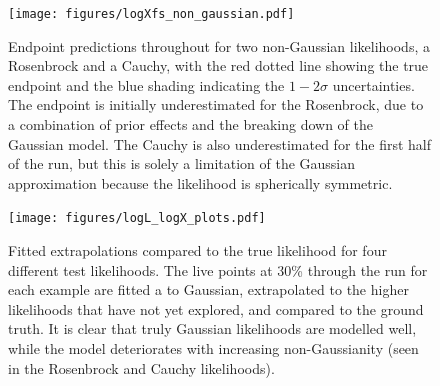 \documentclass[usenatbib]{mnras}
\begin{document}
\begin{figure}
\begin{center}
    \texttt{[image: figures/logXfs\_non\_gaussian.pdf]}
\end{center}
\caption{Endpoint predictions throughout for two non-Gaussian likelihoods, a Rosenbrock and a Cauchy, with the red dotted line showing the true endpoint and the blue shading indicating the $1-2\sigma$ uncertainties. The endpoint is initially underestimated for the Rosenbrock, due to a combination of prior effects and the breaking down of the Gaussian model. The Cauchy is also underestimated for the first half of the run, but this is solely a limitation of the Gaussian approximation because the likelihood is spherically symmetric.}
\label{fig:logXfs_non_gaussian}
\end{figure}

\begin{figure}
\texttt{[image: figures/logL\_logX\_plots.pdf]}
\caption{Fitted extrapolations compared to the true likelihood for four different test likelihoods. The live points at 30\% through the run for each example are fitted a to Gaussian, extrapolated to the higher likelihoods that have not yet explored, and compared to the ground truth. It is clear that truly Gaussian likelihoods are modelled well, while the model deteriorates with increasing non-Gaussianity (seen in the Rosenbrock and Cauchy likelihoods).}
\label{fig:logL_logX_plots}
\end{figure}
\end{document}
